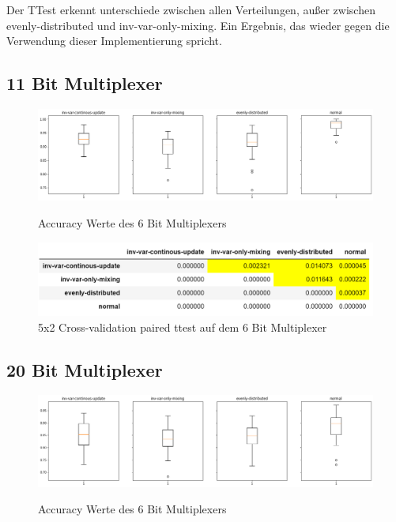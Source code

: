 \documentclass{ocsmnar}
\begin{document}
Der TTest erkennt unterschiede zwischen allen Verteilungen, außer zwischen evenly-distributed und inv-var-only-mixing. Ein Ergebnis, das wieder gegen die Verwendung dieser Implementierung spricht. 

\subsection{11 Bit Multiplexer}

\begin{figure}[h]
    \includegraphics[width=\linewidth]{img/boxplot_11_bit.png}
    \caption{Accuracy Werte des 6 Bit Multiplexers}
    \label{boxplot-6-bit}
\end{figure}

\begin{figure}[h]
    \includegraphics[width=\linewidth]{img/ttest_11_bit.png}
    \caption{5x2 Cross-validation paired ttest auf dem 6 Bit Multiplexer}\label{ttest-6-bit}
\end{figure}

\subsection{20 Bit Multiplexer}

\begin{figure}[h]
    \includegraphics[width=\linewidth]{img/boxplot_20_bit.png}
    \caption{Accuracy Werte des 6 Bit Multiplexers}
    \label{boxplot-6-bit}
\end{figure}
\end{document}
